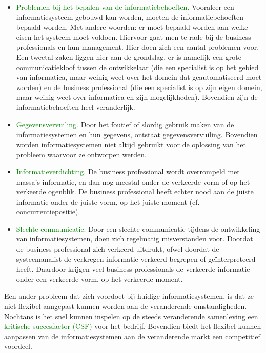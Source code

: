 \begin{itemize}
    \item \textcolor{green}{Problemen bij het bepalen van de informatiebehoeften.}
Vooraleer een informatiesysteem gebouwd kan worden, moeten de informatiebehoeften bepaald worden. Met andere woorden: er moet bepaald worden aan welke eisen het systeem moet voldoen. Hiervoor gaat men te rade bij de business professionals en hun management. Hier doen zich een aantal problemen voor. Een tweetal zaken liggen hier aan de grondslag, er is namelijk een grote communicatiekloof tussen de ontwikkelaar (die een specialist is op het gebied van informatica, maar weinig weet over het domein dat geautomatiseerd moet worden) en de business professional (die een specialist is op zijn eigen domein, maar weinig weet over informatica en zijn mogelijkheden). Bovendien zijn de informatiebehoeften heel veranderlijk.
    \item \textcolor{green}{Gegevensvervuiling.}
Door het foutief of slordig gebruik maken van de informatiesystemen en hun gegevens, ontstaat gegevensvervuiling. Bovendien worden informatiesystemen niet altijd gebruikt voor de oplossing van het probleem waarvoor ze ontworpen werden.
    \item \textcolor{green}{Informatieverdichting.}
De business professional wordt overrompeld met massa's informatie, en dan nog meestal onder de verkeerde vorm of op het verkeerde ogenblik. De business professional heeft echter nood aan de juiste informatie onder de juiste vorm, op het juiste moment (cf. concurrentiepositie).
    \item \textcolor{green}{Slechte communicatie.}
Door een slechte communicatie tijdens de ontwikkeling van informatiesystemen, doen zich regelmatig misverstanden voor. Doordat de business professional zich verkeerd uitdrukt, ofwel doordat de systeemanalist de verkregen informatie verkeerd begrepen of geïnterpreteerd heeft. Daardoor krijgen veel business professionals de verkeerde informatie onder een verkeerde vorm, op het verkeerde moment.
\end{itemize}

\newpage


Een ander probleem dat zich voordoet bij huidige informatiesystemen, is dat ze niet flexibel aangepast kunnen worden aan de veranderende omstandigheden. Nochtans is het snel kunnen inspelen op de steeds veranderende samenleving een \textcolor{green}{kritische succesfactor (CSF)} voor het bedrijf. Bovendien biedt het flexibel kunnen aanpassen van de informatiesystemen aan de veranderende markt een competitief voordeel.

